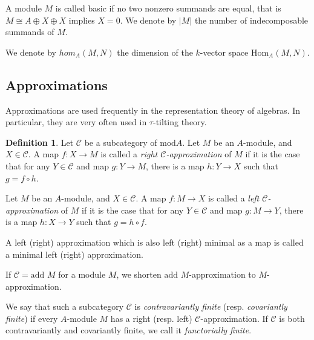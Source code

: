 \documentclass[]{article}
\theoremstyle{definition}
\newtheorem{definition}{Definition}[section]
\newcommand{\tu}{\ensuremath{\tau}}
\begin{document}
A module $M$ is called basic if no two nonzero summands are equal, that is $M \cong A \oplus X \oplus X$ implies $X = 0$. We denote by $|M|$ the number of indecomposable summands of $M$. 

We denote by $hom_A(M,N)$ the dimension of the $k$-vector space $\text{Hom}_A(M,N)$.

\subsection{Approximations}
Approximations are used frequently in the representation theory of algebras. In particular, they are very often used in \tu-tilting theory.

\begin{definition}
	Let $\mathcal{C}$ be a subcategory of $\text{mod} A$.  Let $M$ be an $A$-module, and $X \in \mathcal{C}$. A map $f:X \to M$ is called a \textit{right $\mathcal{C}$-approximation} of $M$ if it is the case that for any $Y \in \mathcal{C}$ and map $g:Y \to M$, there is a map $h:Y \to X$ such that $g = f \circ h$. 
	
	Let $M$ be an $A$-module, and $X \in \mathcal{C}$. A map $f:M \to X$ is called a \textit{left $\mathcal{C}$-approximation} of $M$ if it is the case that for any $Y \in \mathcal{C}$ and map $g:M \to Y$, there is a map $h:X \to Y$ such that $g = h \circ f$. 
	
	A left (right) approximation which is also left (right) minimal as a map is called a minimal left (right) approximation.
	
	If $\mathcal{C} = \text{add } M$ for a module $M$, we shorten $\text{add }M$-approximation to $M$-approximation.
\end{definition}


We say that such a subcategory $\mathcal{C}$ is \textit{contravariantly finite} (resp. \textit{covariantly finite}) if every $A$-module $M$ has a right (resp. left) $\mathcal{C}$-approximation. If $\mathcal{C}$ is both contravariantly and covariantly finite, we call it \textit{functorially finite}.
\end{document}
